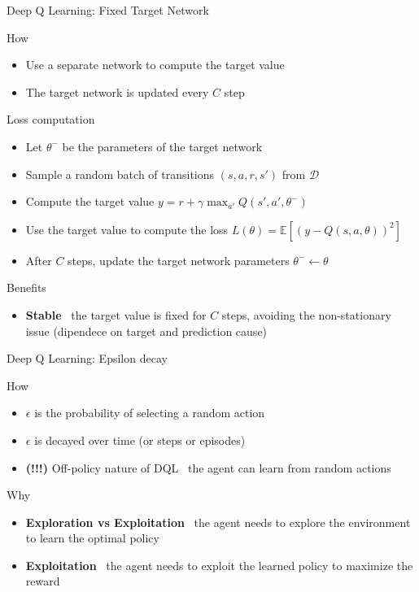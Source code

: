\documentclass[presentation, 9pt]{beamer}\mode<presentation>{\usetheme{AMSBolognaFC}}
\begin{document}
\begin{frame}{Deep Q Learning: Fixed Target Network}
	\centering
	\begin{block}{How}
		\begin{itemize}
			\item Use a separate network to compute the target value
			\item The target network is updated every $C$ step
		\end{itemize}
	\end{block}
	\begin{block}{Loss computation}
		\begin{itemize}
			\item Let $\theta^-$ be the parameters of the target network
			\item Sample a random batch of transitions $(s, a, r, s')$ from $\mathcal{D}$
			\item Compute the target value $y = r + \gamma \max_{a'} Q(s', a', \theta^-)$
			\item Use the target value to compute the loss $L(\theta) = \mathbb{E}[(y - Q(s, a, \theta))^2]$
			\item After $C$ steps, update the target network parameters $\theta^- \leftarrow \theta$
		\end{itemize}
	\end{block}
	\begin{alertblock}{Benefits}
		\begin{itemize}
			\item \textbf{Stable} \faArrowRight \, the target value is fixed for $C$ steps, avoiding the non-stationary issue (dipendece on target and prediction cause)
		\end{itemize}
	\end{alertblock}
\end{frame}
\begin{frame}{Deep Q Learning: Epsilon decay}
	\begin{block}{How}
		\begin{itemize}
			\item $\epsilon$ is the probability of selecting a random action
			\item $\epsilon$ is decayed over time (or steps or episodes)
			\item \textbf{(!!!)} Off-policy nature of DQL \faArrowRight \, the agent can learn from random actions
		\end{itemize}
	\end{block}
	\begin{block}{Why}
		\begin{itemize}
			\item \textbf{Exploration vs Exploitation} \faArrowRight \, the agent needs to explore the environment to learn the optimal policy
			\item \textbf{Exploitation} \faArrowRight \, the agent needs to exploit the learned policy to maximize the reward
		\end{itemize}
	\end{block}
	
\end{frame}
\end{document}
